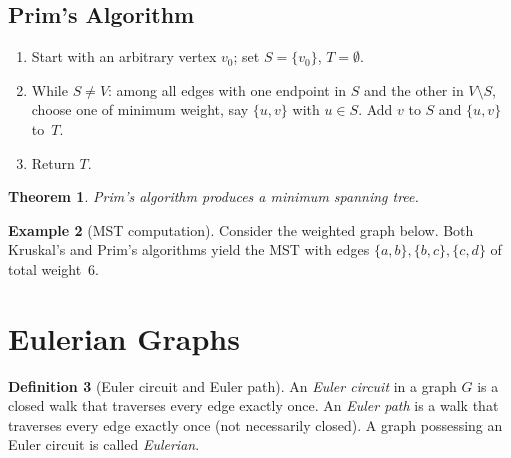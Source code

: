 \documentclass[12pt,a4paper,openany]{book}
\theoremstyle{definition}
\newtheorem{definition}{Definition}[chapter]
\newtheorem{example}[definition]{Example}
\theoremstyle{plain}
\newtheorem{theorem}[definition]{Theorem}
\theoremstyle{remark}
\begin{document}
\subsection{Prim's Algorithm}
\label{ssec:prim}

\begin{enumerate}
  \item Start with an arbitrary vertex $v_0$; set $S=\{v_0\}$, $T=\emptyset$.
  \item While $S\ne V$: among all edges with one endpoint in $S$ and the
        other in $V\setminus S$, choose one of minimum weight, say $\{u,v\}$
        with $u\in S$.  Add $v$ to $S$ and $\{u,v\}$ to~$T$.
  \item Return $T$.
\end{enumerate}

\begin{theorem}
\label{thm:prim-correct}
Prim's algorithm produces a minimum spanning tree.
\end{theorem}

\begin{example}[MST computation]
\label{ex:mst}
Consider the weighted graph below.  Both Kruskal's and Prim's algorithms
yield the MST with edges $\{a,b\},\{b,c\},\{c,d\}$ of total weight~$6$.

\begin{center}
\end{center}
\end{example}

\section{Eulerian Graphs}
\label{sec:euler}

\begin{definition}[Euler circuit and Euler path]
\label{def:euler-circuit}
An \emph{Euler circuit} in a graph $G$ is a closed walk that traverses
every edge exactly once.  An \emph{Euler path} is a walk that
traverses every edge exactly once (not necessarily closed).  A graph
possessing an Euler circuit is called \emph{Eulerian}.
\end{definition}
\end{document}
